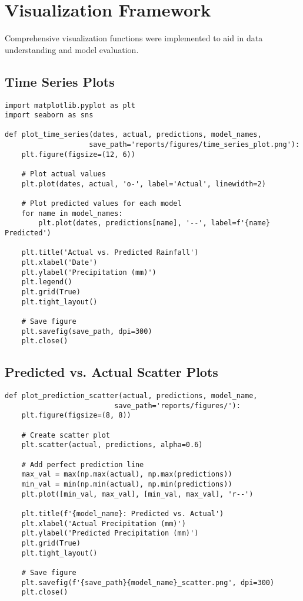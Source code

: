 \documentclass[12pt]{article}
\begin{document}
\section{Visualization Framework}
\label{sec:visualization_framework}

Comprehensive visualization functions were implemented to aid in data understanding and model evaluation.

\subsection{Time Series Plots}
\label{subsec:time_series_plots}

\begin{verbatim}
import matplotlib.pyplot as plt
import seaborn as sns

def plot_time_series(dates, actual, predictions, model_names, 
                    save_path='reports/figures/time_series_plot.png'):
    plt.figure(figsize=(12, 6))
    
    # Plot actual values
    plt.plot(dates, actual, 'o-', label='Actual', linewidth=2)
    
    # Plot predicted values for each model
    for name in model_names:
        plt.plot(dates, predictions[name], '--', label=f'{name} Predicted')
    
    plt.title('Actual vs. Predicted Rainfall')
    plt.xlabel('Date')
    plt.ylabel('Precipitation (mm)')
    plt.legend()
    plt.grid(True)
    plt.tight_layout()
    
    # Save figure
    plt.savefig(save_path, dpi=300)
    plt.close()
\end{verbatim}

\subsection{Predicted vs. Actual Scatter Plots}
\label{subsec:scatter_plots}

\begin{verbatim}
def plot_prediction_scatter(actual, predictions, model_name, 
                          save_path='reports/figures/'):
    plt.figure(figsize=(8, 8))
    
    # Create scatter plot
    plt.scatter(actual, predictions, alpha=0.6)
    
    # Add perfect prediction line
    max_val = max(np.max(actual), np.max(predictions))
    min_val = min(np.min(actual), np.min(predictions))
    plt.plot([min_val, max_val], [min_val, max_val], 'r--')
    
    plt.title(f'{model_name}: Predicted vs. Actual')
    plt.xlabel('Actual Precipitation (mm)')
    plt.ylabel('Predicted Precipitation (mm)')
    plt.grid(True)
    plt.tight_layout()
    
    # Save figure
    plt.savefig(f'{save_path}{model_name}_scatter.png', dpi=300)
    plt.close()
\end{verbatim}
\end{document}
